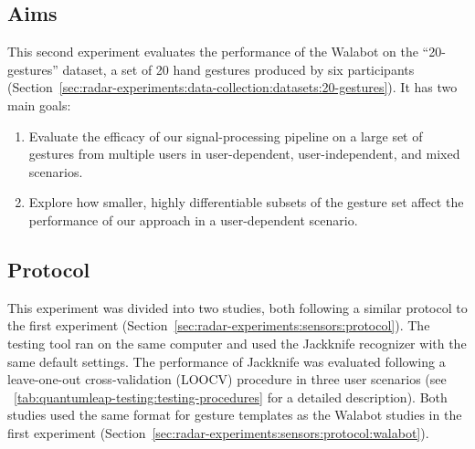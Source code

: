\subsection{Aims} \label{sec:radar-experiments:gesture-subsets:aims}
This second experiment evaluates the performance of the Walabot on the ``20-gestures'' dataset, a set of 20 hand gestures produced by six participants (Section~\ref{sec:radar-experiments:data-collection:datasets:20-gestures}). It has two main goals:
\begin{enumerate}
    \item Evaluate the efficacy of our signal-processing pipeline on a large set of gestures from multiple users in user-dependent, user-independent, and mixed scenarios.
    \item Explore how smaller, highly differentiable subsets of the gesture set affect the performance of our approach in a user-dependent scenario.
\end{enumerate}

\subsection{Protocol} \label{sec:radar-experiments:gesture-subsets:protocol}
This experiment was divided into two studies, both following a similar protocol to the first experiment (Section~\ref{sec:radar-experiments:sensors:protocol}). The \ql testing tool ran on the same computer and used the Jackknife recognizer with the same default settings. The performance of Jackknife was evaluated following a leave-one-out cross-validation (LOOCV) procedure in three user scenarios (see \tab~\ref{tab:quantumleap-testing:testing-procedures} for a detailed description). 
Both studies used the same format for gesture templates as the Walabot studies in the first experiment (Section~\ref{sec:radar-experiments:sensors:protocol:walabot}).

